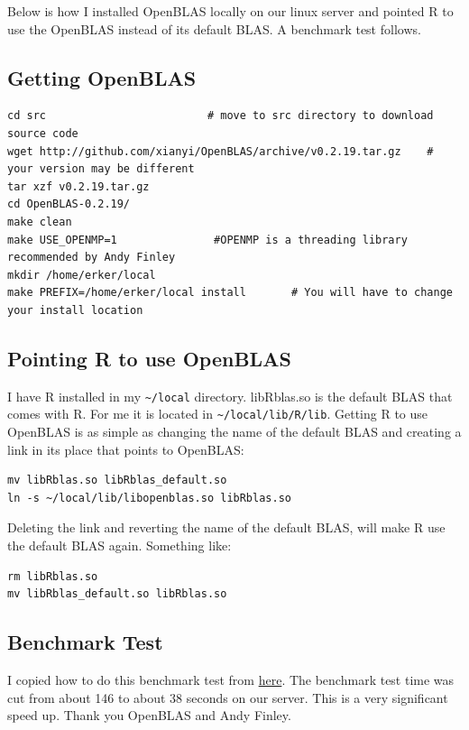 \documentclass{article}
\begin{document}
Below is how I installed OpenBLAS locally on our linux server and
pointed R to use the OpenBLAS instead of its default BLAS.  A
benchmark test follows.

\subsection*{Getting OpenBLAS}
\label{sec:org088ee5b}
\begin{verbatim}
cd src                         # move to src directory to download source code
wget http://github.com/xianyi/OpenBLAS/archive/v0.2.19.tar.gz    # your version may be different
tar xzf v0.2.19.tar.gz
cd OpenBLAS-0.2.19/
make clean
make USE_OPENMP=1               #OPENMP is a threading library recommended by Andy Finley
mkdir /home/erker/local
make PREFIX=/home/erker/local install       # You will have to change your install location
\end{verbatim}

\subsection*{Pointing R to use OpenBLAS}
\label{sec:orgbe038cf}
I have R installed in my \texttt{\textasciitilde{}/local} directory.  libRblas.so is the default
BLAS that comes with R.  For me it is located in \texttt{\textasciitilde{}/local/lib/R/lib}.
Getting R to use OpenBLAS is as simple as changing the name of the
default BLAS and creating a link in its place that points to OpenBLAS:

\begin{verbatim}
mv libRblas.so libRblas_default.so
ln -s ~/local/lib/libopenblas.so libRblas.so
\end{verbatim}

Deleting the link and reverting the name of the default BLAS, will
make R use the default BLAS again. Something like:
\begin{verbatim}
rm libRblas.so
mv libRblas_default.so libRblas.so
\end{verbatim}

\subsection*{Benchmark Test}
\label{sec:org4fb8637}
I copied how to do this benchmark test from \href{http://edustatistics.org/nathanvan/2013/07/09/for-faster-r-use-openblas-instead-better-than-atlas-trivial-to-switch-to-on-ubuntu/}{here}.  The benchmark test
time was cut from about 146 to about 38 seconds on our server.  This is
a very significant speed up.  Thank you OpenBLAS and Andy Finley.
\end{document}
